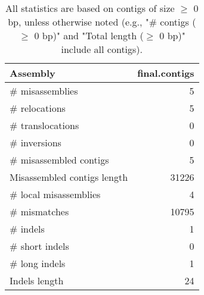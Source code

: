 \documentclass[12pt,a4paper]{article}
\begin{document}
\begin{table}[ht]
\begin{center}
\caption{All statistics are based on contigs of size $\geq$ 0 bp, unless otherwise noted (e.g., "\# contigs ($\geq$ 0 bp)" and "Total length ($\geq$ 0 bp)" include all contigs).}
\begin{tabular}{|l*{1}{|r}|}
\hline
Assembly & final.contigs \\ \hline
\# misassemblies & 5 \\ \hline
\hspace{5mm}\# relocations & 5 \\ \hline
\hspace{5mm}\# translocations & 0 \\ \hline
\hspace{5mm}\# inversions & 0 \\ \hline
\# misassembled contigs & 5 \\ \hline
Misassembled contigs length & 31226 \\ \hline
\# local misassemblies & 4 \\ \hline
\# mismatches & 10795 \\ \hline
\# indels & 1 \\ \hline
\hspace{5mm}\# short indels & 0 \\ \hline
\hspace{5mm}\# long indels & 1 \\ \hline
Indels length & 24 \\ \hline
\end{tabular}
\end{center}
\end{table}
\end{document}
